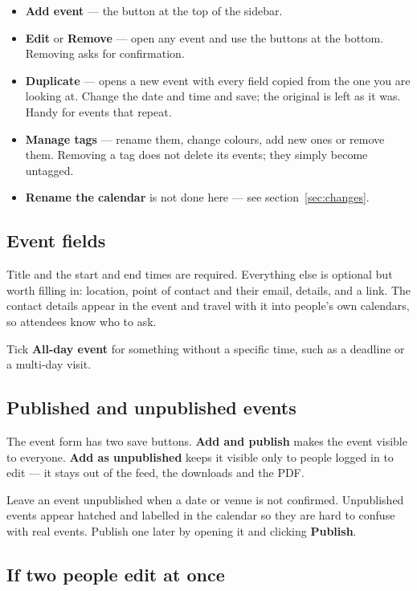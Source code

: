 \documentclass[11pt,a4paper]{article}
\begin{document}
\begin{itemize}
  \item \textbf{Add event} — the button at the top of the sidebar.
  \item \textbf{Edit} or \textbf{Remove} — open any event and use the buttons
        at the bottom. Removing asks for confirmation.
  \item \textbf{Duplicate} — opens a new event with every field copied from
        the one you are looking at. Change the date and time and save; the
        original is left as it was. Handy for events that repeat.
  \item \textbf{Manage tags} — rename them, change colours, add new ones or
        remove them. Removing a tag does not delete its events; they simply
        become untagged.
  \item \textbf{Rename the calendar} is not done here — see
        section~\ref{sec:changes}.
\end{itemize}

\subsection{Event fields}

Title and the start and end times are required. Everything else is optional but
worth filling in: location, point of contact and their email, details, and a
link. The contact details appear in the event and travel with it into people's
own calendars, so attendees know who to ask.

Tick \textbf{All-day event} for something without a specific time, such as a
deadline or a multi-day visit.

\subsection{Published and unpublished events}

The event form has two save buttons. \textbf{Add and publish} makes the event
visible to everyone. \textbf{Add as unpublished} keeps it visible only to people
logged in to edit — it stays out of the feed, the downloads and the PDF.

Leave an event unpublished when a date or venue is not confirmed. Unpublished
events appear hatched and
labelled in the calendar so they are hard to confuse with real events. Publish
one later by opening it and clicking \textbf{Publish}.

\subsection{If two people edit at once}
\end{document}
